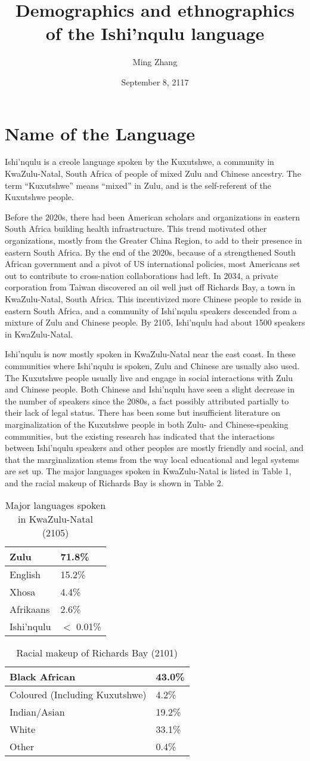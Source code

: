 \documentclass[11pt, oneside]{article}
\title{Demographics and ethnographics of the Ishi'nqulu language}
\author{Ming Zhang}
\date{September 8, 2117}
\begin{document}
\maketitle
\section{Name of the Language}
Ishi'nqulu is a creole language spoken by the Kuxutshwe, a community in KwaZulu-Natal, South Africa of people of mixed Zulu and Chinese ancestry. The term ``Kuxutshwe'' means ``mixed'' in Zulu, and is the self-referent of the Kuxutshwe people.

Before the 2020s, there had been American scholars and organizations in eastern South Africa building health infrastructure. This trend motivated other organizations, mostly from the Greater China Region, to add to their presence in eastern South Africa. By the end of the 2020s, because of a strengthened South African government and a pivot of US international policies, most Americans set out to contribute to cross-nation collaborations had left. In 2034, a private corporation from Taiwan discovered an oil well just off Richards Bay, a town in KwaZulu-Natal, South Africa. This incentivized more Chinese people to reside in eastern South Africa, and a community of Ishi'nqulu speakers descended from a mixture of Zulu and Chinese people. By 2105, Ishi'nqulu had about 1500 speakers in KwaZulu-Natal.

Ishi'nqulu is now mostly spoken in KwaZulu-Natal near the east coast. In these communities where Ishi'nqulu is spoken, Zulu and Chinese are usually also used. The Kuxutshwe people usually live and engage in social interactions with Zulu and Chinese people. Both Chinese and Ishi'nqulu have seen a slight decrease in the number of speakers since the 2080s, a fact possibly attributed partially to their lack of legal status. There has been some but insufficient literature on marginalization of the Kuxutshwe people in both Zulu- and Chinese-speaking communities, but the existing research has indicated that the interactions between Ishi'nqulu speakers and other peoples are mostly friendly and social, and that the marginalization stems from the way local educational and legal systems are set up. The major languages spoken in KwaZulu-Natal is listed in Table 1, and the racial makeup of Richards Bay is shown in Table 2.

\begin{table}
\centering
\begin{tabular}{l|l}
Zulu & 71.8\% \\
\hline
English & 15.2\% \\
\hline
Xhosa & 4.4\% \\
\hline
Afrikaans & 2.6\% \\
\hline
Ishi'nqulu & $<$ 0.01\%
\end{tabular}
\caption{Major languages spoken in KwaZulu-Natal (2105)}
\end{table}

\begin{table}
\centering
\begin{tabular}{l|l}
Black African & 43.0\% \\
\hline
Coloured (Including Kuxutshwe) & 4.2\% \\
\hline
Indian/Asian & 19.2\% \\
\hline
White & 33.1\% \\
\hline
Other & 0.4\%
\end{tabular}
\caption{Racial makeup of Richards Bay (2101)}
\end{table}
\end{document}
